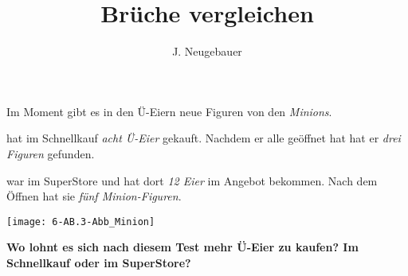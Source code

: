 \documentclass[13pt, a4paper]{scrartcl}
\author{J. Neugebauer}
\title{Brüche vergleichen}
\date{\Heute}
\begin{document}
\ReiheTitel

\bigskip
\begin{minipage}{0.79\textwidth}
	Im Moment gibt es in den Ü-Eiern neue Figuren von den \emph{Minions}.
	
	\medskip
	 hat im Schnellkauf \emph{acht Ü-Eier} gekauft. Nachdem er alle geöffnet hat hat er \emph{drei Figuren} gefunden.
	
	\medskip
	 war im SuperStore und hat dort \emph{12 Eier} im Angebot bekommen. Nach dem Öffnen hat sie \emph{fünf Minion-Figuren}.
\end{minipage} \hfill
\begin{minipage}{0.2\textwidth}
	\begin{center}
		\texttt{[image: 6-AB.3-Abb\_Minion]}
	\end{center}
\end{minipage}

\bigskip
\textbf{Wo lohnt es sich nach diesem Test mehr Ü-Eier zu kaufen? Im Schnellkauf oder im SuperStore?}
\end{document}

